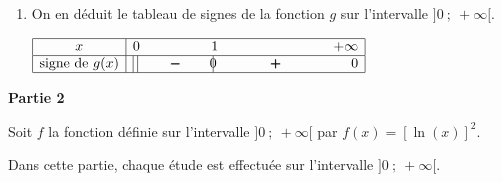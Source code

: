 \begin{enumerate}
\begin{enumerate}
		\item On justifie les limites de la fonction $g$ aux bornes de son ensemble de définition.
		
	\end{enumerate}
	
\item On en déduit le tableau de signes de la fonction $g$ sur l'intervalle $]0~;~+ \infty[$.

\begin{center}
\renewcommand{\arraystretch}{1.2}
\def\esp{\hspace*{1.1cm}}
$\begin{array}{|c |l *{3}{c} r|} 
\hline
x  & 0 & \esp & 1 & \esp\esp  & +\infty \\
\hline
\text{signe de }g(x) & \vline\;\vline  & \pmb{-} &  \vline\hspace{-2.7pt}{0} & \pmb{+} & 0   \\
\hline
\end{array}$
\renewcommand{\arraystretch}{1}
\end{center}

\end{enumerate}

\bigskip

\textbf{Partie 2}

\medskip

Soit $f$ la fonction définie sur l'intervalle $]0~;~ + \infty[$ par 
$f(x) = [\ln (x)]^2.$

 Dans cette partie, chaque étude est effectuée sur l'intervalle $]0~;~+ \infty[$.



